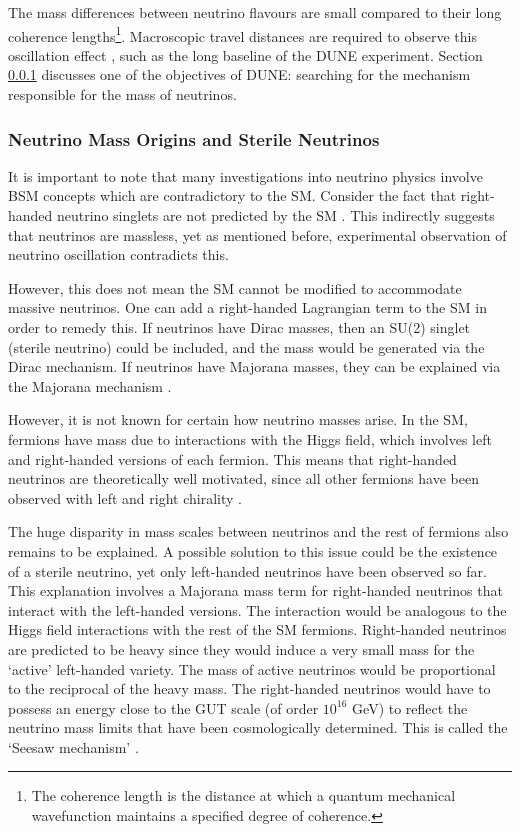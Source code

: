 \documentclass[10pt]{article}
\begin{document}
The mass differences between neutrino flavours are small compared to their long coherence lengths\footnote{The coherence length is the distance at which a quantum mechanical wavefunction maintains a specified degree of coherence.}. Macroscopic travel distances are required to observe this oscillation effect \cite{aartsen2018search}, such as the long baseline of the DUNE experiment. Section \ref{origins_mass} discusses one of the objectives of DUNE: searching for the mechanism responsible for the mass of neutrinos.

\subsubsection{Neutrino Mass Origins and Sterile Neutrinos} \label{origins_mass}
It is important to note that many investigations into neutrino physics involve BSM concepts which are contradictory to the SM. Consider the fact that right-handed neutrino singlets are not predicted by the SM \cite{king2017unified}. This indirectly suggests that neutrinos are massless, yet as mentioned before, experimental observation of neutrino oscillation contradicts this.

However, this does not mean the SM cannot be modified to accommodate massive neutrinos. One can add a right-handed Lagrangian term to the SM in order to remedy this. If neutrinos have Dirac masses, then an SU(2) singlet (sterile neutrino) could be included, and the mass would be generated via the Dirac mechanism. If neutrinos have Majorana masses, they can be explained via the Majorana mechanism \cite{schechter1980neutrino}.

However, it is not known for certain how neutrino masses arise. In the SM, fermions have mass due to interactions with the Higgs field, which involves left and right-handed versions of each fermion. This means that right-handed neutrinos are theoretically well motivated, since all other fermions have been observed with left and right chirality \cite{boyarsky2019sterile}.

The huge disparity in mass scales between neutrinos and the rest of fermions also remains to be explained. A possible solution to this issue could be the existence of a sterile neutrino, yet only left-handed neutrinos have been observed so far. This explanation involves a Majorana mass term for right-handed neutrinos that interact with the left-handed versions. The interaction would be analogous to the Higgs field interactions with the rest of the SM fermions. Right-handed neutrinos are predicted to be heavy since they would induce a very small mass for the `active' left-handed variety. The mass of active neutrinos would be proportional to the reciprocal of the heavy mass. The right-handed neutrinos would have to possess an energy close to the GUT scale (of order $10^{16}$ GeV) to reflect the neutrino mass limits that have been cosmologically determined. This is called the `Seesaw mechanism' \cite{yanagida1980horizontal}.
\end{document}
